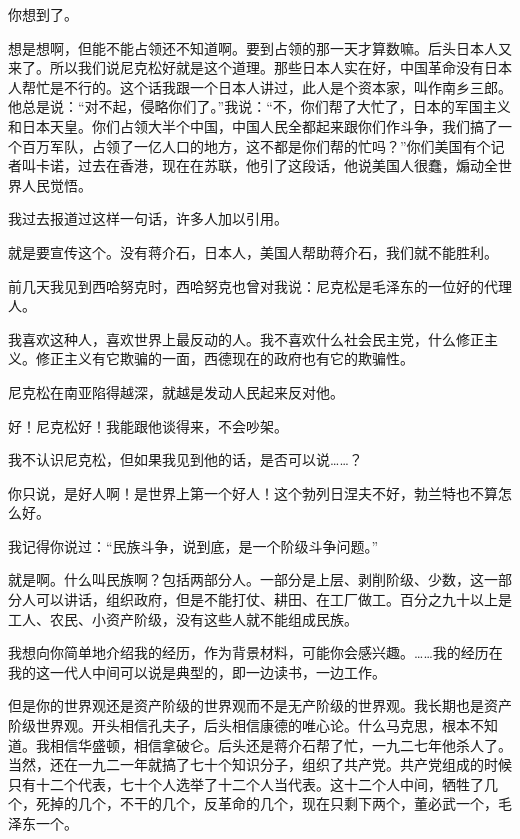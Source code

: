 你想到了。

想是想啊，但能不能占领还不知道啊。要到占领的那一天才算数嘛。后头日本人又来了。所以我们说尼克松好就是这个道理。那些日本人实在好，中国革命没有日本人帮忙是不行的。这个话我跟一个日本人讲过，此人是个资本家，叫作南乡三郎。他总是说：“对不起，侵略你们了。”我说：“不，你们帮了大忙了，日本的军国主义和日本天皇。你们占领大半个中国，中国人民全都起来跟你们作斗争，我们搞了一个百万军队，占领了一亿人口的地方，这不都是你们帮的忙吗？”你们美国有个记者叫卡诺，过去在香港，现在在苏联，他引了这段话，他说美国人很蠢，煽动全世界人民觉悟。

我过去报道过这样一句话，许多人加以引用。

就是要宣传这个。没有蒋介石，日本人，美国人帮助蒋介石，我们就不能胜利。

前几天我见到西哈努克时，西哈努克也曾对我说：尼克松是毛泽东的一位好的代理人。

我喜欢这种人，喜欢世界上最反动的人。我不喜欢什么社会民主党，什么修正主义。修正主义有它欺骗的一面，西德现在的政府也有它的欺骗性。

尼克松在南亚陷得越深，就越是发动人民起来反对他。

好！尼克松好！我能跟他谈得来，不会吵架。

我不认识尼克松，但如果我见到他的话，是否可以说……？

你只说，是好人啊！是世界上第一个好人！这个勃列日涅夫不好，勃兰特也不算怎么好。

我记得你说过：“民族斗争，说到底，是一个阶级斗争问题。”

就是啊。什么叫民族啊？包括两部分人。一部分是上层、剥削阶级、少数，这一部分人可以讲话，组织政府，但是不能打仗、耕田、在工厂做工。百分之九十以上是工人、农民、小资产阶级，没有这些人就不能组成民族。

我想向你简单地介绍我的经历，作为背景材料，可能你会感兴趣。……我的经历在我的这一代人中间可以说是典型的，即一边读书，一边工作。

但是你的世界观还是资产阶级的世界观而不是无产阶级的世界观。我长期也是资产阶级世界观。开头相信孔夫子，后头相信康德的唯心论。什么马克思，根本不知道。我相信华盛顿，相信拿破仑。后头还是蒋介石帮了忙，一九二七年他杀人了。当然，还在一九二一年就搞了七十个知识分子，组织了共产党。共产党组成的时候只有十二个代表，七十个人选举了十二个人当代表。这十二个人中间，牺牲了几个，死掉的几个，不干的几个，反革命的几个，现在只剩下两个，董必武一个，毛泽东一个。

